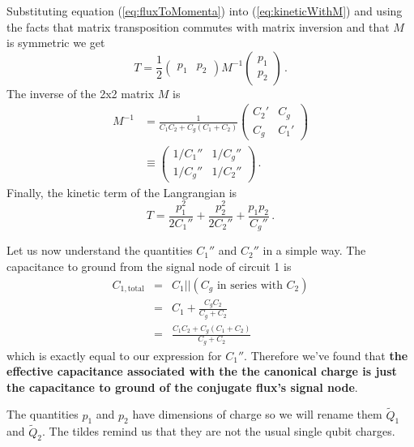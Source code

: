 Substituting equation (\ref{eq:fluxToMomenta}) into (\ref{eq:kineticWithM}) and using the facts that matrix transposition commutes with matrix inversion and that $M$ is symmetric we get
\begin{equation}
T = \frac{1}{2} \left( \begin{array}{cc} p_1&p_2 \end{array} \right) M^{-1} \left( \begin{array}{c} p_1 \\ p_2 \end{array} \right) \, .
\end{equation}
The inverse of the 2x2 matrix $M$ is
\begin{align}
M^{-1} &= \frac{1}{C_1C_2 + C_g(C_1 + C_2)} \left( \begin{array}{cc} C_2' & C_g \\ C_g & C_1' \end{array} \right) \nonumber \\
&\equiv \left( \begin{array}{cc} 1/C_1'' & 1/C_g'' \\ 1/C_g'' & 1/C_2'' \end{array} \right) \, .
\end{align}
Finally, the kinetic term of the Langrangian is \begin{equation}
T = \frac{p_1^2}{2C_1''} + \frac{p_2^2}{2C_2''} + \frac{p_1p_2}{C_g''} \, . \label{eq:kineticInP}
\end{equation}

Let us now understand the quantities $C_1''$ and $C_2''$ in a simple way.
The capacitance to ground from the signal node of circuit 1 is \begin{eqnarray}
C_{1,\textrm{total}} &=& C_1||(C_g \textrm{ in series with } C_2) \nonumber \\
&=& C_1 + \frac{C_g C_2}{C_g+C_2} \nonumber \\
&=& \frac{C_1 C_2 + C_g(C_1+C_2)}{C_g+C_2} \nonumber \end{eqnarray}
which is exactly equal to our expression for $C_1''$.
Therefore we've found that \textbf{the effective capacitance associated with the the canonical charge is just the capacitance to ground of the conjugate flux's signal node}.

The quantities $p_1$ and $p_2$ have dimensions of charge so we will rename them $\tilde{Q}_1$ and $\tilde{Q}_2$.
The tildes remind us that they are not the usual single qubit charges.

